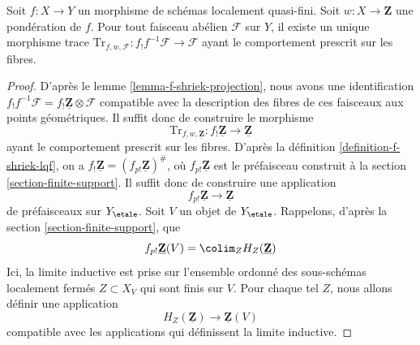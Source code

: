 \begin{lemma}
\label{lemma-trace-map-exists}
Soit $f : X \to Y$ un morphisme de schémas localement quasi-fini.
Soit $w : X \to \mathbf{Z}$ une pondération de $f$. Pour tout faisceau abélien
$\mathcal{F}$ sur $Y$, il existe un unique morphisme trace
$\text{Tr}_{f, w, \mathcal{F}} : f_!f^{-1}\mathcal{F} \to \mathcal{F}$
ayant le comportement prescrit sur les fibres.
\end{lemma}

\begin{proof}
D'après le lemme \ref{lemma-f-shriek-projection}, nous avons une identification
$f_!f^{-1}\mathcal{F} = f_!\underline{\mathbf{Z}} \otimes \mathcal{F}$
compatible avec la description des fibres de ces faisceaux aux
points géométriques. Il suffit donc de construire le morphisme
$$
\text{Tr}_{f, w, \underline{\mathbf{Z}}} :
f_!\underline{\mathbf{Z}}
\longrightarrow
\underline{\mathbf{Z}}
$$
ayant le comportement prescrit sur les fibres. D'après la
définition \ref{definition-f-shriek-lqf}, on a
$f_!\underline{\mathbf{Z}} = (f_{p!}\underline{\mathbf{Z}})^\#$,
où $f_{p!}\underline{\mathbf{Z}}$ est le préfaisceau
construit à la section \ref{section-finite-support}.
Il suffit donc de construire une application
$$
f_{p!}\underline{\mathbf{Z}} \longrightarrow \underline{\mathbf{Z}}
$$
de préfaisceaux sur $Y_\etale$. Soit $V$ un objet de $Y_\etale$.
Rappelons, d'après la section \ref{section-finite-support}, que
$$
f_{p!}\underline{\mathbf{Z}}(V) = \colim_Z H_Z(\underline{\mathbf{Z}})
$$
Ici, la limite inductive est prise sur l'ensemble ordonné des sous-schémas
localement fermés $Z \subset X_V$ qui sont finis sur $V$. Pour chaque tel
$Z$, nous allons définir une application
$$
H_Z(\underline{\mathbf{Z}}) \longrightarrow \underline{\mathbf{Z}}(V)
$$
compatible avec les applications qui définissent la limite inductive.


\end{proof}
